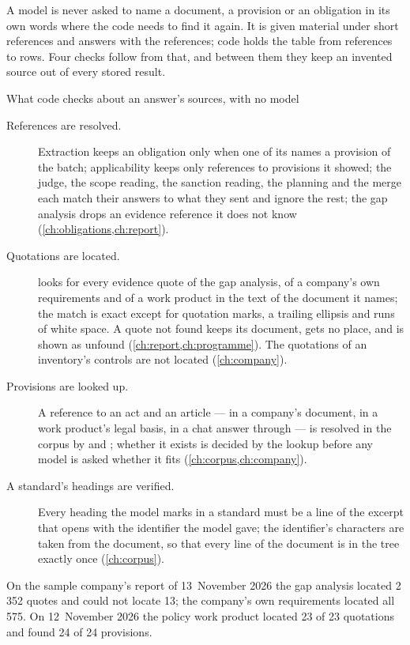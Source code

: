 A model is never asked to name a document, a provision or an obligation in its own words
where the code needs to find it again. It is given material under short references and
answers with the references; code holds the table from references to rows. Four checks
follow from that, and between them they keep an invented source out of every stored result.

\begin{codebox}{What code checks about an answer's sources, with no model}
\begin{description}
  \item[References are resolved.] Extraction keeps an obligation only when one of its
     names a provision of the batch; applicability keeps only references
    to provisions it showed; the judge, the scope reading, the sanction reading, the planning
    and the merge each match their answers to what they sent and ignore the rest; the gap
    analysis drops an evidence reference it does not know (\cref{ch:obligations,ch:report}).
  \item[Quotations are located.]  looks for every evidence quote of the
    gap analysis, of a company's own requirements and of a work product in the text of the
    document it names; the match is exact except for quotation marks, a trailing ellipsis and
    runs of white space. A quote not found keeps its document, gets no place, and is shown as
    unfound (\cref{ch:report,ch:programme}). The quotations of an inventory's controls are not
    located (\cref{ch:company}).
  \item[Provisions are looked up.] A reference to an act and an article --- in a company's
    document, in a work product's legal basis, in a chat answer through
     --- is resolved in the corpus by  and
    ; whether it exists is decided by the lookup before any model is
    asked whether it fits (\cref{ch:corpus,ch:company}).
  \item[A standard's headings are verified.] Every heading the model marks in a standard
    must be a line of the excerpt that opens with the identifier the model gave; the
    identifier's characters are taken from the document, so that every line of the document
    is in the tree exactly once (\cref{ch:corpus}).
\end{description}
\end{codebox}

On the sample company's report of 13~November 2026 the gap analysis located 2\,352 quotes and
could not locate 13; the company's own requirements located all 575. On 12~November 2026 the
policy work product located 23 of 23 quotations and found 24 of 24 provisions.

